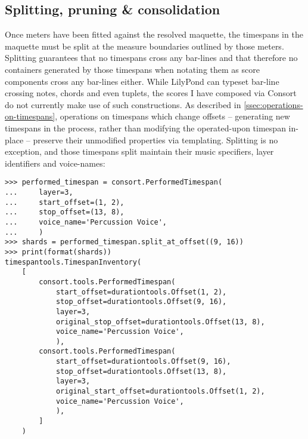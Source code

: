 \subsection{Splitting, pruning \& consolidation}
\label{ssec:splitting-pruning-and-consolidation}

Once meters have been fitted against the resolved maquette, the timespans in
the maquette must be split at the measure boundaries outlined by those meters.
Splitting guarantees that no timespans cross any bar-lines and that therefore
no containers generated by those timespans when notating them as score
components cross any bar-lines either. While LilyPond can typeset bar-line
crossing notes, chords and even tuplets, the scores I have composed via Consort
do not currently make use of such constructions. As described in
\autoref{ssec:operations-on-timespans}, operations on timespans which change
offsets -- generating new timespans in the process, rather than modifying the
operated-upon timespan in-place -- preserve their unmodified properties via
templating. Splitting is no exception, and those timespans split maintain their
music specifiers, layer identifiers and voice-names:

\begin{comment}
<abjad>
performed_timespan = consort.PerformedTimespan(
    layer=3,
    start_offset=(1, 2),
    stop_offset=(13, 8),
    voice_name='Percussion Voice',
    )
shards = performed_timespan.split_at_offset((9, 16))
print(format(shards))
</abjad>
\end{comment}

\begin{abjadbookoutput}
\begin{singlespacing}
\vspace{-0.5\baselineskip}
\begin{lstlisting}
>>> performed_timespan = consort.PerformedTimespan(
...     layer=3,
...     start_offset=(1, 2),
...     stop_offset=(13, 8),
...     voice_name='Percussion Voice',
...     )
>>> shards = performed_timespan.split_at_offset((9, 16))
>>> print(format(shards))
timespantools.TimespanInventory(
    [
        consort.tools.PerformedTimespan(
            start_offset=durationtools.Offset(1, 2),
            stop_offset=durationtools.Offset(9, 16),
            layer=3,
            original_stop_offset=durationtools.Offset(13, 8),
            voice_name='Percussion Voice',
            ),
        consort.tools.PerformedTimespan(
            start_offset=durationtools.Offset(9, 16),
            stop_offset=durationtools.Offset(13, 8),
            layer=3,
            original_start_offset=durationtools.Offset(1, 2),
            voice_name='Percussion Voice',
            ),
        ]
    )
\end{lstlisting}
\end{singlespacing}
\end{abjadbookoutput}

